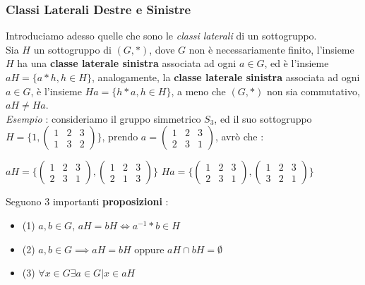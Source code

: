 \documentclass[12pt, letterpaper]{article}
\begin{document}
\subsubsection{Classi Laterali Destre e Sinistre} \label{classiLaterali}
 Introduciamo adesso quelle che sono le \textit{classi laterali} di un sottogruppo.\\
 Sia \(H\) un sottogruppo di \((G,*)\), dove \(G\) non è necessariamente finito, l'insieme 
 \(H\) ha una \textbf{classe laterale sinistra} associata ad ogni \(a\in G\), ed è l'insieme \(aH=\{a*h, h\in H\}\), 
 analogamente, la \textbf{classe laterale sinistra} associata ad ogni \(a\in G\),  è l'insieme \(Ha=\{h*a, h\in H\}\), 
 a meno che \((G,*)\) non sia commutativo, \(aH\ne Ha\). \\
 \textit{Esempio }: consideriamo il gruppo simmetrico \(S_3\), ed il suo sottogruppo \(H=\Bigg\{1,
 \begin{pmatrix}
    1 & 2 & 3\\
    1 & 3 & 2
    \end{pmatrix}
    \Bigg\}\), prendo \(a= \begin{pmatrix}
        1 & 2 & 3\\
        2 & 3 & 1
        \end{pmatrix}\), avrò che : \begin{center}
            \(
            aH=  \Bigg\{\begin{pmatrix}
                1 & 2 & 3\\
                2 & 3 & 1
                \end{pmatrix},
            \begin{pmatrix}
               1 & 2 & 3\\
               2 & 1 & 3
               \end{pmatrix}
               \Bigg\}  
            \) \hphantom{aaaaa} \(
            Ha=   \Bigg\{\begin{pmatrix}
                1 & 2 & 3\\
                2 & 3 & 1
                \end{pmatrix},
            \begin{pmatrix}
               1 & 2 & 3\\
               3 & 2 & 1
               \end{pmatrix}
               \Bigg\} 
            \)
        \end{center}
Seguono 3 importanti \textbf{proposizioni} : \begin{itemize}
    \item (1) \(a,b\in G\), \(aH=bH\iff a^{-1}*b\in H\)
    \item (2) \(a,b\in G\implies aH=bH \) oppure \(aH\cap bH =\emptyset\) 
    \item (3) \(\forall x \in G \exists a\in G | x\in aH\)
\end{itemize}
\end{document}
